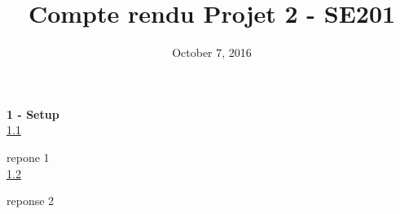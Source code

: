 \documentclass[a4paper,12pt]{article}
\begin{document}
	\title{\textbf{Compte rendu Projet 2 - SE201}}
	\date{October 7, 2016}
	\maketitle

	\Large{\textbf{1 - Setup}}\\\break
    \small
    \underline{1.1}\\
    \setlength{\parindent}{5ex}\par
	repone 1\\\break
    \underline{1.2}\\
    \par
    reponse 2\\\break
\end{document}
